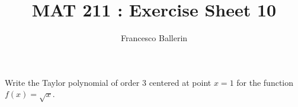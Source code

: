 \documentclass[11pt]{article}%
\title{MAT 211 : Exercise Sheet 10}
\author{Francesco Ballerin}
\date{\color{gray}{\small{francesco.ballerin@uib.no}}}
\begin{document}
\begin{minipage}[t]{\dimexpr \textwidth-6cm-\columnsep}
     \maketitle
\end{minipage}
\hfill\noindent{}

\vspace{50pt}


\bigskip


\begin{Exercise}[title=*$\dagger$]
Write the Taylor polynomial of order 3 centered at point $x=1$ for the function $f(x)=\sqrt x$.
\end{Exercise}
\end{document}
